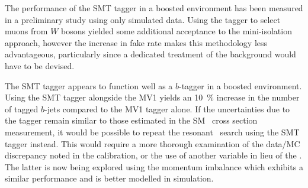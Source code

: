 The performance of the SMT tagger in a boosted environment has been measured in a preliminary study using only simulated data. Using the tagger to select muons from $W$ bosons yielded some additional acceptance to the mini-isolation approach, however the increase in fake rate makes this methodology less advantageous, particularly since a dedicated treatment of the background would have to be devised.

The SMT tagger appears to function well as a $b$-tagger in a boosted environment. Using the SMT tagger alongside the MV1 yields an \SI{10}{\percent} increase in the number of tagged $b$-jets compared to the MV1 tagger alone. If the uncertainties due to the tagger remain similar to those estimated in the SM \ttbar\ cross section measurement, it would be possible to repeat the resonant \ttbar\ search using the SMT tagger instead. This would require a more thorough examination of the data/MC discrepancy noted in the calibration, or the use of another variable in lieu of the \xsd. The latter is now being explored using the momentum imbalance which exhibits a similar performance and is better modelled in simulation.

